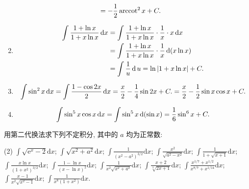 \begin{solution}
\begin{enumerate}
\begin{align*}
                                                                  & = -\frac{1}{2} \operatorname{arccot}^2 x + C.
              \end{align*}
        \item \begin{align*}
                  \int \frac{1 + \ln x}{1 + x \ln x} \operatorname{d\!} x & = \int \frac{1 + \ln x}{1 + x \ln x} \cdot \frac{1}{x} \cdot x \operatorname{d\!} x  \\
                                                            & = \int \frac{1 + \ln x}{1 + x \ln x} \cdot \frac{1}{x} \operatorname{d} (x \ln x) \\
                                                            & = \int \frac{1}{u} \operatorname{d} u = \ln |1 + x \ln x| + C.
              \end{align*}
        \item $$\int \sin^2 x \operatorname{d\!} x = \int \frac{1 - \cos 2x}{2} \operatorname{d\!} x = \frac{x}{2} - \frac{1}{4} \sin 2x + C. = \frac{x}{2} - \frac{1}{2} \sin x \cos x + C.$$
        \item $$\int \sin^5 x \cos x \operatorname{d\!} x = \int \sin^5 x \operatorname{d} (\sin x) = \frac{1}{6} \sin^6 x + C.$$
    \end{enumerate}
\end{solution}

\begin{exercise}[4.1.3]
    用第二代换法求下列不定积分, 其中的 $a$ 均为正常数:
    \begin{tasks}(2)
        \task $\displaystyle \int \sqrt{\mathrm{e}^x - 2} \mathrm{d}x$;
        \task $\displaystyle \int \sqrt{x^2 + a^2} \mathrm{d}x$;
        \task $\displaystyle \int \frac{1}{(x^2 - a^2)^{3/2}} \mathrm{d}x$;
        \task $\displaystyle \int \frac{x^2}{\sqrt{a^2 - x^2}} \mathrm{d}x$;
        \task $\displaystyle \int \frac{1}{1 + \sqrt{x+ 1} } \mathrm{d}x$;
        \task $\displaystyle \int \frac{x \ln x}{(1 + x^2)^{3/2}} \mathrm{d}x$;
        \task $\displaystyle \int \frac{1 - \ln x}{(x - \ln x)^2} \mathrm{d}x$;
        \task $\displaystyle \int \frac{1}{x^2 \sqrt{x^2 + a^2}} \mathrm{d}x$;
        \task $\displaystyle \int \frac{x + 2}{\sqrt[3]{2x + 1}} \mathrm{d}x$;
        \task $\displaystyle \int \frac{x^{1/7} + x^{1/2}}{x^{8/7} + x^{1/14}} \mathrm{d}x$;
        \task $\displaystyle \int \frac{x - 1}{x^2 \sqrt{x^2 - 1}} \mathrm{d}x$;
        \task $\displaystyle \int \frac{1}{x^8 (1 + x^2)} \mathrm{d}x$.
    \end{tasks}
\end{exercise}


